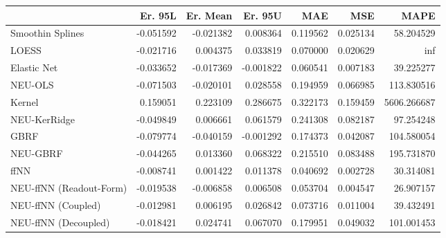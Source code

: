 \begin{tabular}{lrrrrrr}
\toprule
{} &   Er. 95L &  Er. Mean &   Er. 95U &       MAE &       MSE &         MAPE \\
\midrule
Smoothin Splines        & -0.051592 & -0.021382 &  0.008364 &  0.119562 &  0.025134 &    58.204529 \\
LOESS                   & -0.021716 &  0.004375 &  0.033819 &  0.070000 &  0.020629 &          inf \\
Elastic Net             & -0.033652 & -0.017369 & -0.001822 &  0.060541 &  0.007183 &    39.225277 \\
NEU-OLS                 & -0.071503 & -0.020101 &  0.028558 &  0.194959 &  0.066985 &   113.830516 \\
Kernel                  &  0.159051 &  0.223109 &  0.286675 &  0.322173 &  0.159459 &  5606.266687 \\
NEU-KerRidge            & -0.049849 &  0.006661 &  0.061579 &  0.241308 &  0.082187 &    97.254248 \\
GBRF                    & -0.079774 & -0.040159 & -0.001292 &  0.174373 &  0.042087 &   104.580054 \\
NEU-GBRF                & -0.044265 &  0.013360 &  0.068322 &  0.215510 &  0.083488 &   195.731870 \\
ffNN                    & -0.008741 &  0.001422 &  0.011378 &  0.040692 &  0.002728 &    30.314081 \\
NEU-ffNN (Readout-Form) & -0.019538 & -0.006858 &  0.006508 &  0.053704 &  0.004547 &    26.907157 \\
NEU-ffNN (Coupled)      & -0.012981 &  0.006195 &  0.026842 &  0.073716 &  0.011004 &    39.432491 \\
NEU-ffNN (Decoupled)    & -0.018421 &  0.024741 &  0.067070 &  0.179951 &  0.049032 &   101.001453 \\
\bottomrule
\end{tabular}
